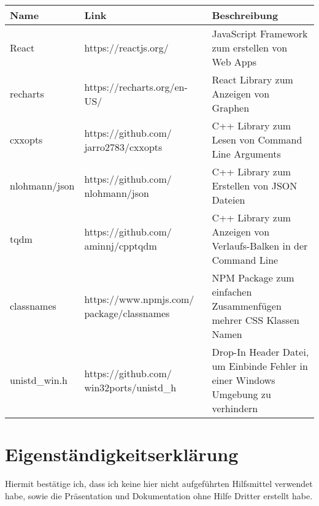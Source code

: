 \documentclass[a4paper, 12pt, oneside]{article}
\begin{document}
    \begin{tabularx}{\textwidth}{p{}|p{}|p{}}
    Name & Link & Beschreibung \\

    \hline

    React & https://reactjs.org/ & JavaScript Framework zum erstellen von Web Apps \\

    \hline

    recharts & https://recharts.org/en-US/ & React Library zum Anzeigen von Graphen \\
    
    \hline
    
    cxxopts & https://github.com/ \allowbreak jarro2783/cxxopts & C++ Library zum Lesen von Command Line Arguments \\
    
    \hline
    
    nlohmann/json & https://github.com/ \allowbreak nlohmann/json & C++ Library zum Erstellen von JSON Dateien \\
    
    \hline
    
    tqdm & https://github.com/ \allowbreak aminnj/cpptqdm & C++ Library zum Anzeigen von Verlaufs-Balken in der Command Line \\
    
    \hline
    
    classnames & https://www.npmjs.com/ \allowbreak package/classnames & NPM Package zum einfachen Zusammenfügen mehrer CSS Klassen Namen \\
    
    \hline
    
    unistd\_win.h & https://github.com/ \allowbreak win32ports/unistd\_h & Drop-In Header Datei, um Einbinde Fehler in einer Windows Umgebung zu verhindern \\
    
    \end{tabularx}


    \cleardoublepage
    \section{Eigenständigkeitserklärung}

    Hiermit bestätige ich, dass ich keine hier nicht aufgeführten Hilfsmittel verwendet habe, sowie 
    die Präsentation und Dokumentation ohne Hilfe Dritter erstellt habe. 
\end{document}
